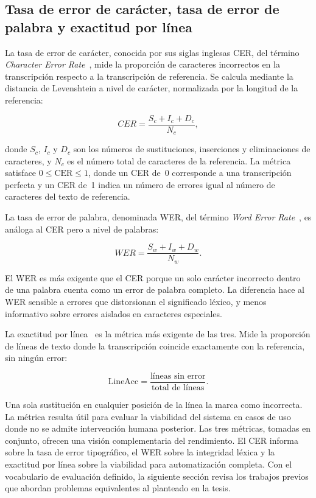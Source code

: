 \subsection{Tasa de error de carácter, tasa de error de palabra y exactitud por línea}

La tasa de error de carácter, conocida por sus siglas inglesas CER, del término \textit{Character Error Rate}~\cite{jurafsky2024slp}, mide la proporción de caracteres incorrectos en la transcripción respecto a la transcripción de referencia. Se calcula mediante la distancia de Levenshtein a nivel de carácter, normalizada por la longitud de la referencia:

\begin{equation}
	CER = \frac{S_c + I_c + D_c}{N_c},
	\label{eq:cer}
\end{equation}

donde $S_c$, $I_c$ y $D_c$ son los números de sustituciones, inserciones y eliminaciones de caracteres, y $N_c$ es el número total de caracteres de la referencia. La métrica satisface $0 \leq \mathrm{CER} \leq 1$, donde un CER de~0 corresponde a una transcripción perfecta y un CER de~1 indica un número de errores igual al número de caracteres del texto de referencia.

La tasa de error de palabra, denominada WER, del término \textit{Word Error Rate}~\cite{jurafsky2024slp}, es análoga al CER pero a nivel de palabras:

\begin{equation}
	WER = \frac{S_w + I_w + D_w}{N_w}.
	\label{eq:wer}
\end{equation}

El WER es más exigente que el CER porque un solo carácter incorrecto dentro de una palabra cuenta como un error de palabra completo. La diferencia hace al WER sensible a errores que distorsionan el significado léxico, y menos informativo sobre errores aislados en caracteres especiales.

La exactitud por línea~\cite{jurafsky2024slp} es la métrica más exigente de las tres. Mide la proporción de líneas de texto donde la transcripción coincide exactamente con la referencia, sin ningún error:

\begin{equation}
	\mathrm{LineAcc} = \frac{\text{líneas sin error}}{\text{total de líneas}}.
	\label{eq:lineacc}
\end{equation}

Una sola sustitución en cualquier posición de la línea la marca como incorrecta. La métrica resulta útil para evaluar la viabilidad del sistema en casos de uso donde no se admite intervención humana posterior. Las tres métricas, tomadas en conjunto, ofrecen una visión complementaria del rendimiento. El CER informa sobre la tasa de error tipográfico, el WER sobre la integridad léxica y la exactitud por línea sobre la viabilidad para automatización completa. Con el vocabulario de evaluación definido, la siguiente sección revisa los trabajos previos que abordan problemas equivalentes al planteado en la tesis.

